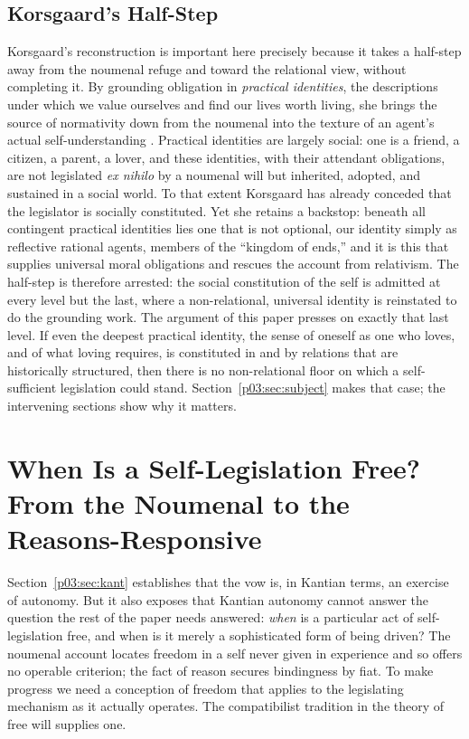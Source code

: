 \documentclass[11pt,a4paper]{article}
\begin{document}
\subsection{Korsgaard's Half-Step}

Korsgaard's reconstruction is important here precisely because it takes a half-step away from the noumenal refuge and toward the relational view, without completing it. By grounding obligation in \emph{practical identities}, the descriptions under which we value ourselves and find our lives worth living, she brings the source of normativity down from the noumenal into the texture of an agent's actual self-understanding \parencite{korsgaard1996sources}. Practical identities are largely social: one is a friend, a citizen, a parent, a lover, and these identities, with their attendant obligations, are not legislated \emph{ex nihilo} by a noumenal will but inherited, adopted, and sustained in a social world. To that extent Korsgaard has already conceded that the legislator is socially constituted. Yet she retains a backstop: beneath all contingent practical identities lies one that is not optional, our identity simply as reflective rational agents, members of the ``kingdom of ends,'' and it is this that supplies universal moral obligations and rescues the account from relativism. The half-step is therefore arrested: the social constitution of the self is admitted at every level but the last, where a non-relational, universal identity is reinstated to do the grounding work. The argument of this paper presses on exactly that last level. If even the deepest practical identity, the sense of oneself as one who loves, and of what loving requires, is constituted in and by relations that are historically structured, then there is no non-relational floor on which a self-sufficient legislation could stand. Section~\ref{p03:sec:subject} makes that case; the intervening sections show why it matters.

\section{When Is a Self-Legislation Free? From the Noumenal to the Reasons-Responsive}\label{p03:sec:freewill}

Section~\ref{p03:sec:kant} establishes that the vow is, in Kantian terms, an exercise of autonomy. But it also exposes that Kantian autonomy cannot answer the question the rest of the paper needs answered: \emph{when} is a particular act of self-legislation free, and when is it merely a sophisticated form of being driven? The noumenal account locates freedom in a self never given in experience and so offers no operable criterion; the fact of reason secures bindingness by fiat. To make progress we need a conception of freedom that applies to the legislating mechanism as it actually operates. The compatibilist tradition in the theory of free will supplies one.
\end{document}
